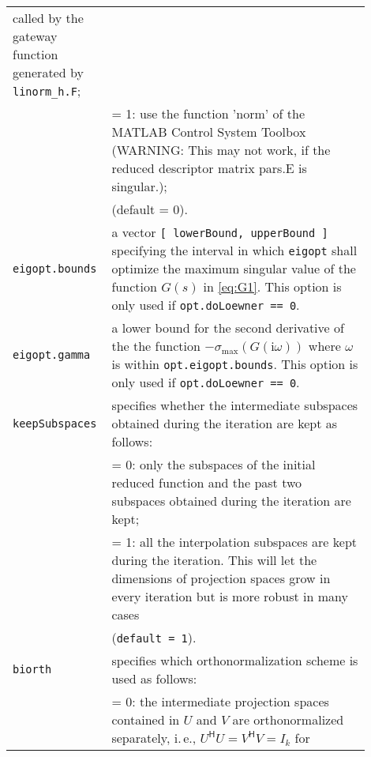 \documentclass[10pt,a4paper]{article}
\begin{document}
\begin{longtable}{p{0.2\linewidth}p{0.7\linewidth}}
                              called by the gateway function generated
                              by \texttt{linorm\_h.F}; \\
                       & = 1: use the function 'norm' of the MATLAB
                              Control System Toolbox (WARNING: This may
                              not work, if the reduced descriptor matrix
                              pars.E is singular.); \\
                       & (default = 0). \\ \hline                       
\texttt{eigopt.bounds} & a vector \texttt{[ lowerBound,  upperBound ]} specifying
                         the interval in which \texttt{eigopt} shall optimize the
                         maximum singular value of the function $G(s)$ in 
                         \eqref{eq:G1}. This option is only used if 
                         \texttt{opt.doLoewner == 0}. \\ \hline
\texttt{eigopt.gamma}  & a lower bound for the second derivative of the
                         the function $-\sigma_{\max}(G(\mathrm{i}\omega))$ where $\omega$ is 
                         within \texttt{opt.eigopt.bounds}. This option is only
                         used if \texttt{opt.doLoewner == 0}. \\ \hline
\texttt{keepSubspaces} & specifies whether the intermediate subspaces
                         obtained during the iteration are kept as
                         follows: \\
                       & = 0: only the subspaces of the initial reduced
                         function and the past two subspaces
                         obtained during the iteration are kept; \\
                       & = 1: all the interpolation subspaces are kept 
                         during the iteration. This will let the 
                         dimensions of projection spaces grow in
                         every iteration but is more robust in many
                         cases \\
                       & (\texttt{default = 1}). \\ \hline
\texttt{biorth}        & specifies which orthonormalization scheme is
                         used as follows: \\
                       & = 0: the intermediate projection spaces
                         contained in $U$ and $V$ are orthonormalized
                         separately, i.\,e., $U^\textsf{H} U = V^\textsf{H} V = I_k$ for

\end{longtable}
\end{document}
